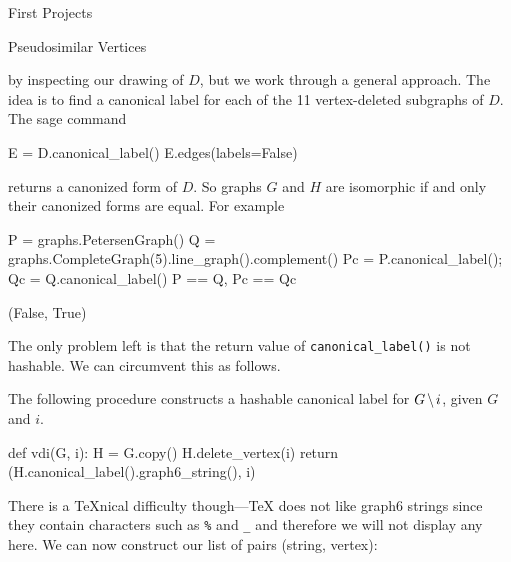 \begin{chap}{First Projects}
\begin{sect}{Pseudosimilar Vertices}
\begin{para}
by inspecting our drawing of $D$, but we work through a general approach.
The idea is to find a canonical label for each of the 11 vertex-deleted subgraphs
of $D$. The sage command
\end{para}
%
\begin{sagecode}
\begin{sageinput}
E = D.canonical_label()
E.edges(labels=False)
\end{sageinput}
\begin{sageoutput}
[(0, 10), (1, 10), (2, 8), (3, 9), (4, 6), 
(4, 10), (5, 7), (5, 8), (6, 9), (7, 9)]
\end{sageoutput}
\end{sagecode}
%
\begin{para}
returns a canonized form of $D$. So graphs $G$ and $H$ are isomorphic if and only
their canonized forms are equal. For example
\end{para}
%
\begin{sagecode}
\begin{sageinput}
P = graphs.PetersenGraph()
Q = graphs.CompleteGraph(5).line_graph().complement()
Pc = P.canonical_label(); Qc = Q.canonical_label()
P == Q, Pc == Qc
\end{sageinput}
\begin{sageoutput}
(False, True)
\end{sageoutput}
\end{sagecode}
%
\begin{para}
The only problem left is that the return value of \verb|canonical_label()|
is not hashable. We can circumvent this as follows.
\end{para}
%
\begin{para}
The following procedure constructs a hashable canonical label for 
$G\mathbin{\mkern-1.5mu\setminus\mkern-1.5mu} i$, given $G$ and $i$.
\end{para}
%
\begin{sagecode}
\begin{sageinput}
def vdi(G, i):
    H = G.copy()
    H.delete_vertex(i)
    return (H.canonical_label().graph6_string(), i)
\end{sageinput}
\end{sagecode}
%
\begin{para}
There is a \TeX{}nical difficulty though---\TeX{} does not like graph6 strings
since they contain characters such as \verb|%| and \verb|_| and therefore we will not display 
any here. We can now construct our list of pairs (string, vertex):
\end{para}
%
\begin{sagecode}

\end{sagecode}
\end{sect}
\end{chap}
